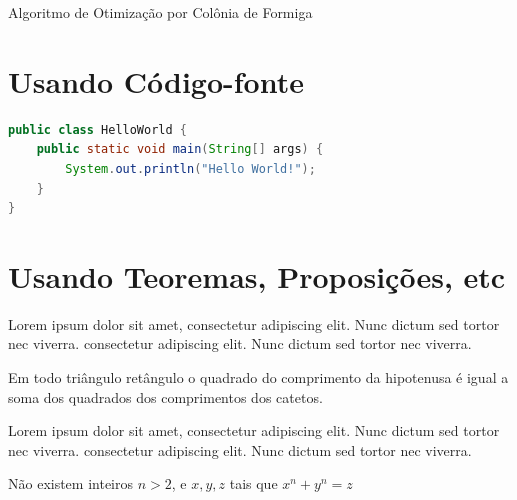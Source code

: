 \lipsum[8]

\begin{algorithm}[h!]
	\SetSpacedAlgorithm
	\caption{\label{alg:algoritmo_de_colonica_de_formigas}Algoritmo de Otimização por Colônia de Formiga}
\end{algorithm}

\lipsum[9]

\section{Usando Código-fonte}

\lipsum[10]



\lipsum[11]

\begin{lstlisting}[language=Java,caption={Hello World em Java}]
public class HelloWorld {
	public static void main(String[] args) {
		System.out.println("Hello World!");
	}
}
\end{lstlisting}

\lipsum[11]

\section{Usando Teoremas, Proposições, etc}

Lorem ipsum dolor sit amet, consectetur adipiscing elit. Nunc dictum sed tortor nec viverra. consectetur adipiscing elit. Nunc dictum sed tortor nec viverra.

\begin{teo}[Pitágoras]
	Em todo triângulo retângulo o quadrado do comprimento da
	hipotenusa é igual a soma dos quadrados dos comprimentos dos catetos.
\end{teo}


Lorem ipsum dolor sit amet, consectetur adipiscing elit. Nunc dictum sed tortor nec viverra. consectetur adipiscing elit. Nunc dictum sed tortor nec viverra.

\begin{teo}[Fermat]
	Não existem inteiros $n > 2$, e $x, y, z$ tais que $x^n + y^n = z$
\end{teo}

